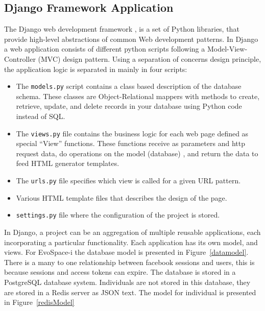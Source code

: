 \documentclass{sig-alternate}
\begin{document}
\subsection{Django Framework Application}
The Django web development framework \cite{django}, is a set of Python libraries, that provide high-level abstractions of common Web development patterns. In Django a web application consists of different python scripts following a Model-View-Controller (MVC) design pattern. Using a separation of concerns design principle, the application logic is separated in mainly in four scripts:
\begin{itemize}
	\item The \texttt{models.py} script contains a class based description of the database schema. These classes are Object-Relational mappers with methods to create, retrieve, update, and delete records in your database using Python code instead of SQL.
	\item The \texttt{views.py} file contains the business logic for each web page defined as special  ``View'' functions. These functions receive as parameters and http request data, do operations on the model (database) , and return the data to feed HTML generator templates.
	\item The \texttt{urls.py} file specifies which view is called for a given URL pattern.
    \item Various HTML template files that describes the design of the page.
    \item \texttt{settings.py} file where the configuration of the project is stored.
\end{itemize}

In Django, a project can be an aggregation of multiple reusable applications, each incorporating a particular functionality. Each application has its own model, and views. For EvoSpace-i the database model is presented in Figure~\ref{datamodel}. There is a many to one relationship between facebook sessions and users, this is because sessions and access tokens can expire. The database is stored in a PostgreSQL database system. Individuals are not stored in this database, they are stored in a Redis server as JSON text. The model for individual is presented in Figure~\ref{redisModel}
\end{document}

